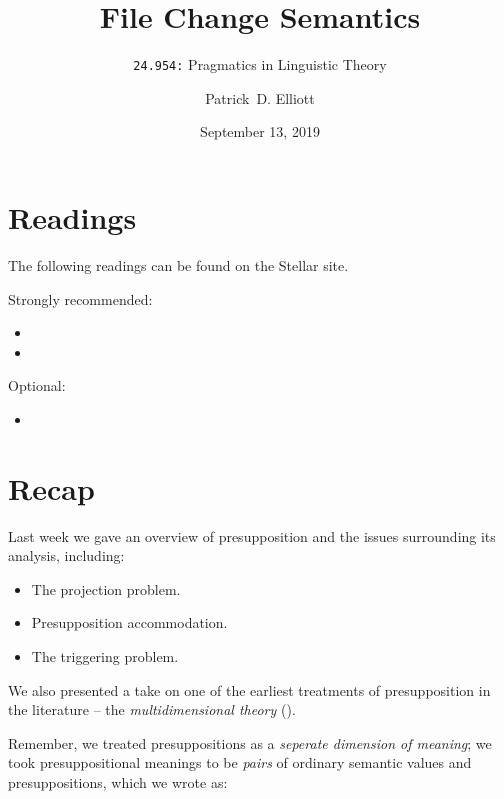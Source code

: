 \documentclass[cronos,landscape,paper=letter]{ling-handout}
\title{File Change Semantics}
\subtitle{\texttt{24.954:} Pragmatics in Linguistic Theory}
\date{September 13, 2019}
\author{Patrick~D. Elliott}
\begin{document}
\maketitle

\section*{Readings}

%
The following readings can be found on the Stellar site.

Strongly recommended:

\begin{itemize}

    \item {}

    \item {}

\end{itemize}

Optional:

\begin{itemize}

    \item {}

\end{itemize}

\section*{Recap}

Last week we gave an overview of presupposition and the issues surrounding its analysis, including:
\begin{itemize}
  \item The projection problem.
  \item Presupposition accommodation.
    \item The triggering problem.
\end{itemize}

We also presented a take on one of the earliest treatments of presupposition in the literature -- the \textit{multidimensional theory} (\citealt{karttunenPeters1979}).

Remember, we treated presuppositions as a \textit{seperate dimension of meaning}; we took presuppositional meanings to be \textit{pairs} of ordinary semantic values and presuppositions, which we wrote as:
\end{document}
